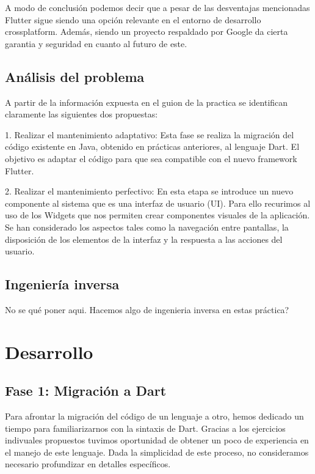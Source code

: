 \documentclass{article}
\begin{document}
A modo de conclusión podemos decir que a pesar de las desventajas mencionadas Flutter sigue siendo una opción relevante en el entorno de desarrollo crossplatform. Además, siendo un proyecto
respaldado por Google da cierta garantia y seguridad en cuanto al futuro de este. 

\subsection{Análisis del problema}
A partir de la información expuesta en el guion de la practica se identifican claramente las siguientes dos propuestas:

1. Realizar el mantenimiento adaptativo:
Esta fase se realiza la migración del código existente en Java, obtenido en prácticas anteriores, al lenguaje Dart. El objetivo es adaptar el código para que sea compatible con el nuevo framework Flutter. 

2. Realizar el mantenimiento perfectivo:
En esta etapa se introduce un nuevo componente al sistema que es una interfaz de usuario (UI). Para ello recurimos al uso de los Widgets que nos permiten crear componentes visuales de la aplicación.
Se han considerado los aspectos tales como la navegación entre pantallas, la disposición de los elementos de la interfaz y la respuesta a las acciones del usuario. 


\subsection{Ingeniería inversa}
No se qué poner aqui. Hacemos algo de ingenieria inversa en estas práctica?

\newpage

\section{Desarrollo}

\subsection{Fase 1: Migración a Dart}

Para afrontar la migración del código de un lenguaje a otro, hemos dedicado un tiempo para familiarizarnos con la sintaxis de Dart. Gracias a los ejercicios indivuales propuestos tuvimos oportunidad de obtener un poco de experiencia en el manejo de este lenguaje. Dada la simplicidad de este proceso, no consideramos necesario profundizar en detalles específicos.
\end{document}
